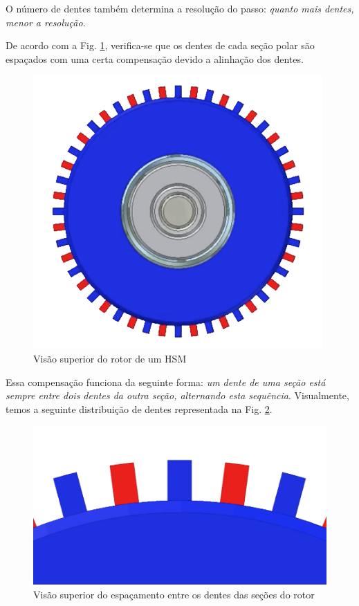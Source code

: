 	O número de dentes também determina a resolução do passo: \emph{quanto mais dentes, menor a resolução}.
	
	De acordo com a Fig. \ref{rotor3}, verifica-se que os dentes de cada seção polar são espaçados com uma certa compensação devido a alinhação dos dentes. 
	
	\begin{figure}[H]
		\centering 
		\includegraphics[scale=0.3]{images/hsm_operation/rotormag3}
		\caption{Visão superior do rotor de um HSM}
		\label{rotor3}
	\end{figure}
	
	Essa compensação funciona da seguinte forma: \emph{um dente de uma seção está sempre entre dois dentes da outra seção, alternando esta sequência}. Visualmente, temos a seguinte distribuição de dentes representada na Fig. \ref{rotor4}.
	
	\begin{figure}[H]
		\centering 
		\includegraphics[scale=0.2]{images/hsm_operation/rotormag4}
		\caption{Visão superior do espaçamento entre os dentes das seções do rotor}
		\label{rotor4}
	\end{figure}
	
